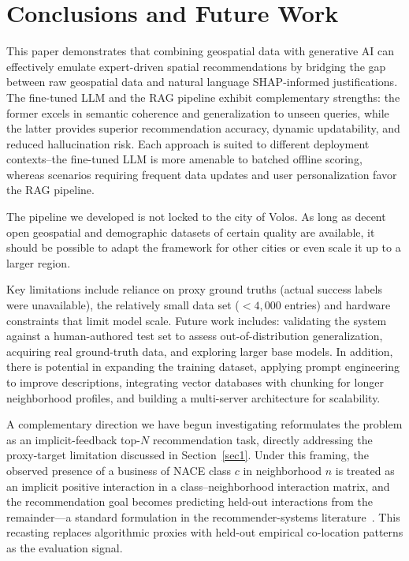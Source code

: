 \documentclass[pdflatex,sn-mathphys-num]{sn-jnl}%
\theoremstyle{thmstyleone}%
\theoremstyle{thmstyletwo}%
\theoremstyle{thmstylethree}%
\begin{document}
\section{Conclusions and Future Work} \label{sec:concl}

This paper demonstrates that combining geospatial data with generative AI can effectively emulate expert-driven spatial recommendations by bridging the gap between raw geospatial data and natural language SHAP-informed justifications. The fine-tuned LLM and the RAG pipeline exhibit complementary strengths: the former excels in semantic coherence and generalization to unseen queries, while the latter provides superior recommendation accuracy, dynamic updatability, and reduced hallucination risk. Each approach is suited to different deployment contexts--the fine-tuned LLM is more amenable to batched offline scoring, whereas scenarios requiring frequent data updates and user personalization favor the RAG pipeline.


The pipeline we developed is not locked to the city of Volos. As long as decent open geospatial and demographic datasets of certain quality are available, it should be possible to adapt the framework for other cities or even scale it up to a larger region.

Key limitations include reliance on proxy ground truths (actual success labels were unavailable), the relatively small data set ($< 4,000$ entries) and hardware constraints that limit model scale. Future work includes: validating the system against a human-authored test set to assess out-of-distribution generalization, acquiring real ground-truth data, and exploring larger base models. In addition, there is potential in expanding the training dataset, applying prompt engineering to improve descriptions, integrating vector databases with chunking for longer neighborhood profiles, and building a multi-server architecture for scalability. 

A complementary direction we have begun investigating reformulates the problem as 
an implicit-feedback top-$N$ recommendation task, directly addressing the 
proxy-target limitation discussed in Section~\ref{sec1}. Under this framing, the 
observed presence of a business of NACE class $c$ in neighborhood $n$ is treated 
as an implicit positive interaction in a class--neighborhood interaction matrix, 
and the recommendation goal becomes predicting held-out interactions from the 
remainder---a standard formulation in the recommender-systems 
literature~\cite{hu2008, rendle2009}. This recasting replaces algorithmic proxies 
with held-out empirical co-location patterns as the evaluation signal.
\end{document}
